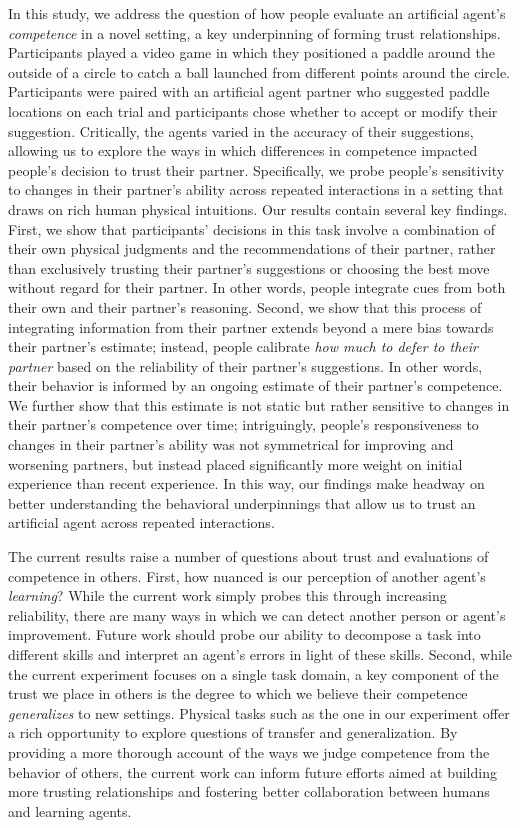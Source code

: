 \documentclass[10pt,letterpaper]{article}
\begin{document}
In this study, we address the question of how people evaluate an artificial agent's \textit{competence} in a novel setting, a key underpinning of forming trust relationships. Participants played a video game in which they positioned a paddle around the outside of a circle to catch a ball launched from different points around the circle. Participants were paired with an artificial agent partner who suggested paddle locations on each trial and participants chose whether to accept or modify their suggestion. Critically, the agents varied in the accuracy of their suggestions, allowing us to explore the ways in which differences in competence impacted people's decision to trust their partner. Specifically, we probe people's sensitivity to changes in their partner's ability across repeated interactions in a setting that draws on rich human physical intuitions. Our results contain several key findings. First, we show that participants' decisions in this task involve a combination of their own physical judgments and the recommendations of their partner, rather than exclusively trusting their partner's suggestions or choosing the best move without regard for their partner. In other words, people integrate cues from both their own and their partner's reasoning. Second, we show that this process of integrating information from their partner extends beyond a mere bias towards their partner's estimate; instead, people calibrate \textit{how much to defer to their partner} based on the reliability of their partner's suggestions. In other words, their behavior is informed by an ongoing estimate of their partner's competence. We further show that this estimate is not static but rather sensitive to changes in their partner's competence over time; intriguingly, people's responsiveness to changes in their partner's ability was not symmetrical for improving and worsening partners, but instead placed significantly more weight on initial experience than recent experience. In this way, our findings make headway on better understanding the behavioral underpinnings that allow us to trust an artificial agent across repeated interactions. 

The current results raise a number of questions about trust and evaluations of competence in others. First, how nuanced is our perception of another agent's \textit{learning}? While the current work simply probes this through increasing reliability, there are many ways in which we can detect another person or agent's improvement. Future work should probe our ability to decompose a task into different skills and interpret an agent's errors in light of these skills. Second, while the current experiment focuses on a single task domain, a key component of the trust we place in others is the degree to which we believe their competence \textit{generalizes} to new settings. Physical tasks such as the one in our experiment offer a rich opportunity to explore questions of transfer and generalization. By providing a more thorough account of the ways we judge competence from the behavior of others, the current work can inform future efforts aimed at building more trusting relationships and fostering better collaboration between humans and learning agents.
\end{document}
